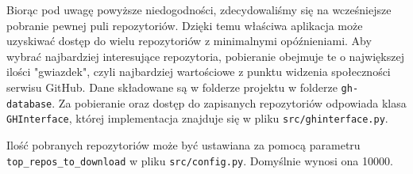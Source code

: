 \documentclass[12pt, oneside, final]{report}
\begin{document}
Biorąc pod uwagę powyższe niedogodności, zdecydowaliśmy się na wcześniejsze pobranie pewnej puli repozytoriów. Dzięki temu właściwa aplikacja może uzyskiwać dostęp do wielu repozytoriów z minimalnymi opóźnieniami. Aby wybrać najbardziej interesujące repozytoria, pobieranie obejmuje te o największej ilości "gwiazdek", czyli najbardziej wartościowe z punktu widzenia społeczności serwisu GitHub. Dane składowane są w folderze projektu w folderze \texttt{gh-database}. Za pobieranie oraz dostęp do zapisanych repozytoriów odpowiada klasa \texttt{GHInterface}, której implementacja znajduje się w pliku \texttt{src/ghinterface.py}.

Ilość pobranych repozytoriów może być ustawiana za pomocą parametru \texttt{top\_repos\_to\_down\-load} w pliku \texttt{src/config.py}. Domyślnie wynosi ona 10000.
\end{document}
